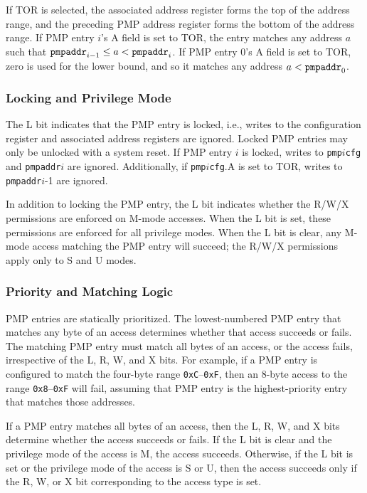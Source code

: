 If TOR is selected, the associated address register forms the top of the
address range, and the preceding PMP address register forms the bottom of the
address range.  If PMP entry $i$'s A field is set to TOR, the entry matches
any address $a$ such that ${\tt pmpaddr}_{i-1}\leq a < {\tt pmpaddr}_i$.  If
PMP entry 0's A field is set to TOR, zero is used for the lower bound, and so
it matches any address $a < {\tt pmpaddr}_0$.

\subsubsection*{Locking and Privilege Mode}

The L bit indicates that the PMP entry is locked, i.e., writes to the
configuration register and associated address registers are ignored.  Locked
PMP entries may only be unlocked with a system reset.  If PMP entry $i$ is
locked, writes to {\tt pmp}$i${\tt cfg} and {\tt pmpaddr}$i$ are ignored.
Additionally, if {\tt pmp}$i${\tt cfg}.A is set to TOR, writes to {\tt
pmpaddr}$i$-1 are ignored.

In addition to locking the PMP entry, the L bit indicates whether the R/W/X
permissions are enforced on M-mode accesses.  When the L bit is set, these
permissions are enforced for all privilege modes.  When the L bit is clear,
any M-mode access matching the PMP entry will succeed; the R/W/X
permissions apply only to S and U modes.

\subsubsection*{Priority and Matching Logic}

PMP entries are statically prioritized.  The lowest-numbered PMP entry that
matches any byte of an access determines whether that access succeeds or
fails.  The matching PMP entry must match all bytes of an access, or the
access fails, irrespective of the L, R, W, and X bits.  For example, if a PMP
entry is configured to match the four-byte range {\tt 0xC}--{\tt 0xF}, then an
8-byte access to the range {\tt 0x8}--{\tt 0xF} will fail, assuming that
PMP entry is the highest-priority entry that matches those addresses.

If a PMP entry matches all bytes of an access, then the L, R, W, and X bits
determine whether the access succeeds or fails.  If the L bit is clear and the
privilege mode of the access is M, the access succeeds.  Otherwise, if the
L bit is set or the privilege mode of the access is S or U, then the access
succeeds only if the R, W, or X bit corresponding to the access type is set.

